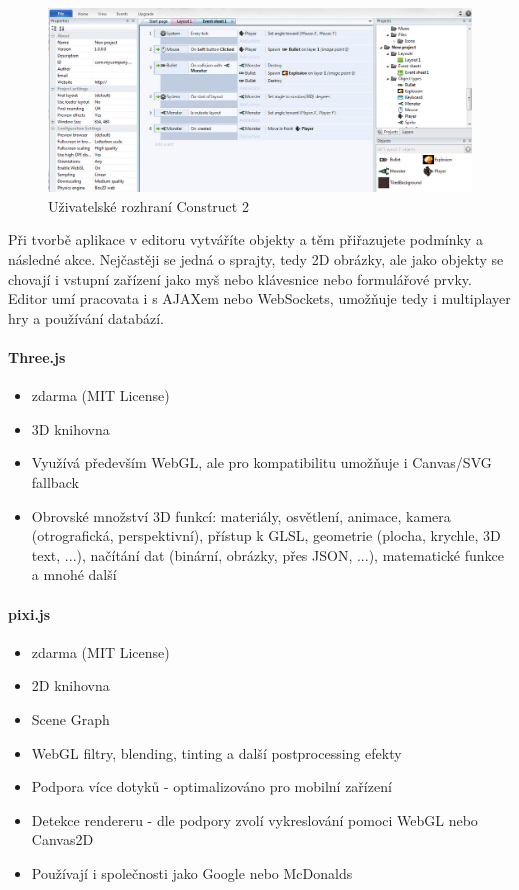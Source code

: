 \documentclass[12pt,a4paper,titlepage,final]{report}
\begin{document}
\begin{figure}[ht]
\begin{center}
\includegraphics[width=14cm]{images/construct2.jpg}
\caption{Uživatelské rozhraní Construct 2}
\label{fig:theory}
\end{center}
\end{figure}

Při tvorbě aplikace v editoru vytváříte objekty a těm přiřazujete podmínky a následné akce. Nejčastěji se jedná o sprajty, tedy 2D obrázky, ale jako objekty se chovají i vstupní zařízení jako myš nebo klávesnice nebo formulářové prvky. Editor umí pracovata i s AJAXem nebo WebSockets, umožňuje tedy i multiplayer hry a používání databází.

\paragraph{Three.js} \cite{threejs}

\begin{itemize}
	\item zdarma (MIT License)
	\item 3D knihovna
	\item Využívá především WebGL, ale pro kompatibilitu umožňuje i Canvas/SVG fallback
	\item Obrovské množství 3D funkcí: materiály, osvětlení, animace, kamera (otrografická, perspektivní), přístup k GLSL, geometrie (plocha, krychle, 3D text, ...), načítání dat (binární, obrázky, přes JSON, ...), matematické funkce a mnohé další	
\end{itemize}

\paragraph{pixi.js} \cite{pixi}

\begin{itemize}
	\item zdarma (MIT License)
	\item 2D knihovna
	\item Scene Graph
	\item WebGL filtry, blending, tinting a další postprocessing efekty
	\item Podpora více dotyků - optimalizováno pro mobilní zařízení
	\item Detekce rendereru - dle podpory zvolí vykreslování pomoci WebGL nebo Canvas2D
	\item Používají i společnosti jako Google nebo McDonalds
\end{itemize}
\end{document}
